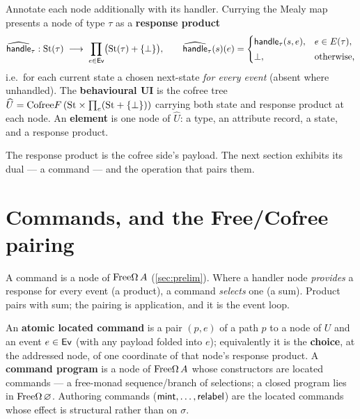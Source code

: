 \documentclass[../uxoxo-main]{subfiles}
\begin{document}
\begin{definition}\label{def:mealy}
Annotate each node additionally with its handler. Currying the Mealy map presents a
node of type $\tau$ as a \textbf{response product}
\[
  \widehat{\mathsf{handle}}_\tau : \mathrm{St}(\tau)\;\longrightarrow\;\prod_{e\in\mathsf{Ev}}\bigl(\mathrm{St}(\tau)+\{\bot\}\bigr),
  \qquad \widehat{\mathsf{handle}}_\tau(s)(e)=\begin{cases}\mathsf{handle}_\tau(s,e),& e\in E(\tau),\\[2pt]\bot,&\text{otherwise,}\end{cases}
\]
i.e.\ for each current state a chosen next-state \emph{for every event} (absent
where unhandled). The \textbf{behavioural UI} is the cofree tree
$\widehat U=\mathrm{Cofree} F\,(\mathrm{St}\times\textstyle\prod_{e}(\mathrm{St}+\{\bot\}))$ carrying both
state and response product at each node. An \textbf{element} is one node of
$\widehat U$: a type, an attribute record, a state, and a response product.
\end{definition}

The response product is the cofree side's payload. The next section exhibits its
dual --- a command --- and the operation that pairs them.

\section{Commands, and the Free/Cofree pairing}\label{sec:pairing}
A command is a node of $\mathrm{Free}\Omega\,A$ (\cref{sec:prelim}). Where a handler
node \emph{provides} a response for every event (a product), a command
\emph{selects} one (a sum). Product pairs with sum; the pairing is application,
and it is the event loop.

\begin{definition}\label{def:located}
An \textbf{atomic located command} is a pair $(p,e)$ of a path $p$ to a node of
$U$ and an event $e\in\mathsf{Ev}$ (with any payload folded into $e$); equivalently it is
the \textbf{choice}, at the addressed node, of one coordinate of that node's
response product. A \textbf{command program} is a node of $\mathrm{Free}\Omega\,A$ whose
constructors are located commands --- a free-monad sequence/branch of selections;
a closed program lies in $\mathrm{Free}\Omega\,\varnothing$. Authoring commands
($\mathsf{mint},\dots,\mathsf{relabel}$) are the located commands whose effect is structural
rather than on $\sigma$.
\end{definition}
\end{document}
